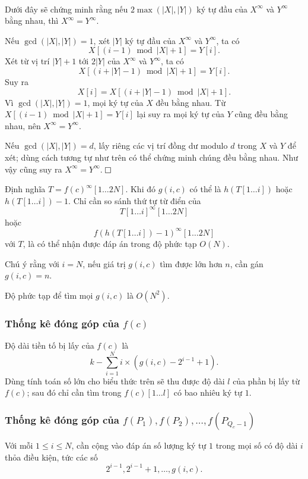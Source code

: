 \documentclass[11pt]{article}
\newcommand{\proofbox}{\ensuremath{\vcenter{\hrule height 0.45pt
  \hbox{\vrule width 0.45pt height 6pt\kern 6pt\vrule width 0.45pt}
  \hrule height 0.45pt}}}
\begin{document}
\paragraph{}
Dưới đây sẽ chứng minh rằng nếu \(2\max(|X|,|Y|)\) ký tự đầu của \(X^\infty\)
và \(Y^\infty\) bằng nhau, thì \(X^\infty=Y^\infty\).

Nếu \(\gcd(|X|,|Y|)=1\), xét \(|Y|\) ký tự đầu của \(X^\infty\) và
\(Y^\infty\), ta có
\[
X[(i-1)\bmod |X|+1]=Y[i].
\]
Xét từ vị trí \(|Y|+1\) tới \(2|Y|\) của \(X^\infty\) và \(Y^\infty\), ta có
\[
X[(i+|Y|-1)\bmod |X|+1]=Y[i].
\]
Suy ra
\[
X[i]=X[(i+|Y|-1)\bmod |X|+1].
\]
Vì \(\gcd(|X|,|Y|)=1\), mọi ký tự của \(X\) đều bằng nhau. Từ
\(X[(i-1)\bmod |X|+1]=Y[i]\) lại suy ra mọi ký tự của \(Y\) cũng đều bằng
nhau, nên \(X^\infty=Y^\infty\).

Nếu \(\gcd(|X|,|Y|)=d\), lấy riêng các vị trí đồng dư modulo \(d\) trong \(X\)
và \(Y\) để xét; dùng cách tương tự như trên có thể chứng minh chúng đều bằng
nhau. Như vậy cũng suy ra \(X^\infty=Y^\infty\). \proofbox

Định nghĩa \(T=f(c)^\infty[1\ldots 2N]\). Khi đó \(g(i,c)\) có thể là
\(h(T[1\ldots i])\) hoặc \(h(T[1\ldots i])-1\). Chỉ cần so sánh thứ tự từ điển
của
\[
T[1\ldots i]^\infty[1\ldots 2N]
\]
hoặc
\[
f(h(T[1\ldots i])-1)^\infty[1\ldots 2N]
\]
với \(T\), là có thể nhận được đáp án trong độ phức tạp \(O(N)\).

Chú ý rằng với \(i=N\), nếu giá trị \(g(i,c)\) tìm được lớn hơn \(n\), cần gán
\(g(i,c)=n\).

Độ phức tạp để tìm mọi \(g(i,c)\) là \(O(N^2)\).

\subsubsection{Thống kê đóng góp của \texorpdfstring{\(f(c)\)}{f(c)}}

Độ dài tiền tố bị lấy của \(f(c)\) là
\[
k-\sum_{i=1}^{N} i\times\left(g(i,c)-2^{i-1}+1\right).
\]
Dùng tính toán số lớn cho biểu thức trên sẽ thu được độ dài \(l\) của phần bị
lấy từ \(f(c)\); sau đó chỉ cần tìm trong \(f(c)[1\ldots l]\) có bao nhiêu ký
tự \(1\).

\subsubsection{Thống kê đóng góp của \texorpdfstring{\(f(P_1),f(P_2),\ldots,
f(P_{Q_c-1})\)}{f(P1),...,f(PQc-1)}}

Với mỗi \(1\le i\le N\), cần cộng vào đáp án số lượng ký tự \(1\) trong mọi số
có độ dài \(i\) thỏa điều kiện, tức các số
\[
2^{i-1},2^{i-1}+1,\ldots,g(i,c).
\]
\end{document}
